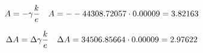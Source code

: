 \documentclass[12pt,a4paper]{article}
\newcommand{\CalcFive} [1]{\fpeval{round((#1),5)}}
\begin{document}
\begin{equation*}
	\begin{aligned}
		A = -\gamma\frac{k}{e} \quad & A = -\CalcFive{\GammaMean}\cdot\CalcFive{(1.38e-23) / (1.6e-19)} = \CalcFive{\WorkFunction}
	\end{aligned}
\end{equation*}

\begin{equation*}
	\begin{aligned}
		\Delta A = \Delta\gamma\frac{k}{e} \quad & \Delta A = \CalcFive{\DeltaGamma}\cdot\CalcFive{(1.38e-23) / (1.6e-19)} = \CalcFive{\DeltaWorkFunction}
	\end{aligned}
\end{equation*}
\end{document}
